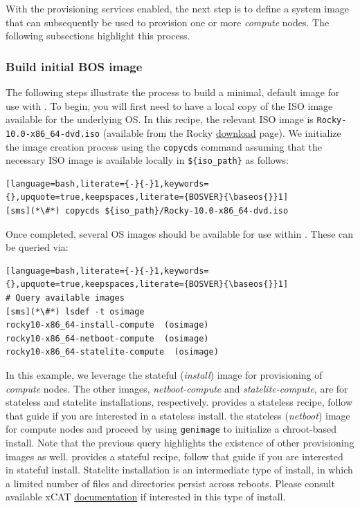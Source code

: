 
With the provisioning services enabled, the next step is to define
a system image that can subsequently be
used to provision one or more {\em compute} nodes. The following subsections highlight this process.

\subsubsection{Build initial BOS image} \label{sec:assemble_bos}
The following steps illustrate the process to build a minimal, default image for use with \xCAT{}. To begin, you will
first need to have a local copy of the ISO image available for the underlying OS. In this recipe, the relevant ISO image
is \texttt{Rocky-10.0-x86\_64-dvd.iso} (available from the Rocky
\href{https://rockylinux.org/download/}{\color{blue}download} page).
We initialize the image
creation process using the \texttt{copycds} command assuming that the necessary ISO image is available locally in
\texttt{\$\{iso\_path\}} as follows:

\begin{lstlisting}[language=bash,literate={-}{-}1,keywords={},upquote=true,keepspaces,literate={BOSVER}{\baseos{}}1]
[sms](*\#*) copycds ${iso_path}/Rocky-10.0-x86_64-dvd.iso
\end{lstlisting}

\noindent Once completed, several OS images should be available for use within \xCAT{}. These can be queried via:

\begin{lstlisting}[language=bash,literate={-}{-}1,keywords={},upquote=true,keepspaces,literate={BOSVER}{\baseos{}}1]
# Query available images
[sms](*\#*) lsdef -t osimage
rocky10-x86_64-install-compute  (osimage)
rocky10-x86_64-netboot-compute  (osimage)
rocky10-x86_64-statelite-compute  (osimage)
\end{lstlisting}

In this example, we leverage
the stateful ({\em install}) image for provisioning of {\em
compute} nodes.  The other images, {\em
netboot-compute} and {\em statelite-compute}, are for stateless and statelite
installations, respectively. \OHPC{} provides a stateless \xCAT{} recipe,
follow that guide if you are interested in a stateless install.
\else
the stateless ({\em netboot}) image for compute nodes and proceed by using
\texttt{genimage} to initialize a chroot-based install. Note that the previous query highlights the existence of other
provisioning images as well. \OHPC{} provides a stateful \xCAT{} recipe,
follow that guide if you are interested in stateful install.
\fi
Statelite installation is an intermediate type of install, in which a limited
number of files and directories persist across reboots.  Please consult
available xCAT \href{https://xcat-docs.readthedocs.io/en/stable/}{\color{blue}
documentation} if interested in this type of install.
